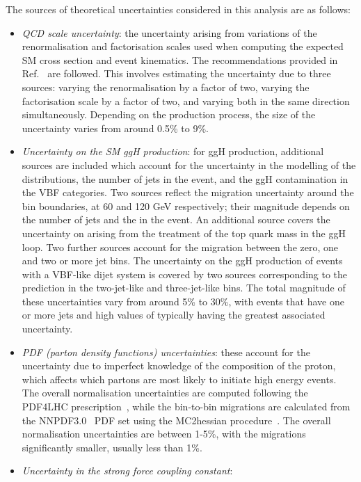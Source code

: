 The sources of theoretical uncertainties considered in this analysis are as follows:
\begin{itemize}
\item \textit{QCD scale uncertainty}: 
  the uncertainty arising from variations of the renormalisation and factorisation scales
  used when computing the expected SM cross section and event kinematics.
  The recommendations provided in Ref.~\cite{YR4} are followed.
  This involves estimating the uncertainty due to three sources: 
  varying the renormalisation by a factor of two, varying the factorisation scale by a factor of two, 
  and varying both in the same direction simultaneously.
  Depending on the production process, the size of the uncertainty varies from around 0.5\% 
  to 9\%.
\item \textit{Uncertainty on the SM ggH production}: 
  for ggH production, 
  additional sources are included which account for the uncertainty in the modelling 
  of the \ptH distributions, the number of jets in the event, 
  and the ggH contamination in the VBF categories.
  Two sources reflect the migration uncertainty around the \ptH bin boundaries,
  at 60 and 120 GeV respectively; 
  their magnitude depends on the number of jets and the \ptH in the event.
  An additional source covers the uncertainty on \ptH 
  arising from the treatment of the top quark mass in the ggH loop.
  Two further sources account for the migration between the zero, one and two or more jet bins.
  The uncertainty on the ggH production of events with a VBF-like dijet system 
  is covered by two sources 
  corresponding to the prediction in the two-jet-like and three-jet-like bins.
  The total magnitude of these uncertainties vary from around 5\% to 30\%, 
  with events that have one or more jets and high values of \ptH 
  typically having the greatest associated uncertainty.
\item \textit{PDF (parton density functions) uncertainties}:
  these account for the uncertainty due to imperfect knowledge of the composition of the proton, 
  which affects which partons are most likely to initiate high energy events.
  The overall normalisation uncertainties are computed
  following the PDF4LHC
  prescription~\cite{PDF4LHC,YR3},
  while the bin-to-bin migrations are calculated from the
  NNPDF3.0~\cite{NNPDF3} PDF set
  using the {\sc MC2hessian} procedure~\cite{MC2Hessian}.
  The overall normalisation uncertainties are between 1-5\%, 
  with the migrations significantly smaller, usually less than 1\%.
\item \textit{Uncertainty in the strong force coupling constant}: 

\end{itemize}
